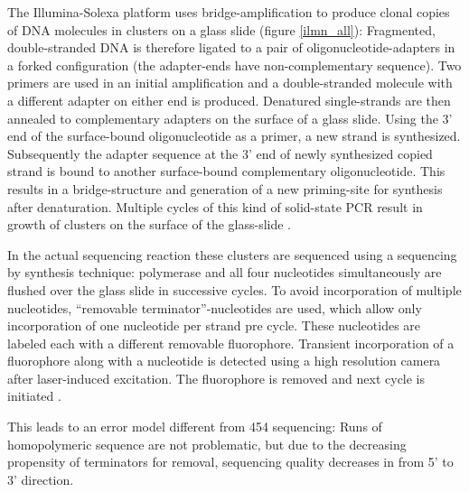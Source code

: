 
The Illumina-Solexa platform uses bridge-amplification to produce
clonal copies of DNA molecules in clusters on a glass slide (figure
\ref{ilmn_all}): Fragmented, double-stranded DNA is therefore ligated to
a pair of oligonucleotide-adapters in a forked configuration (the
adapter-ends have non-complementary sequence). Two primers are used in
an initial amplification and a double-stranded molecule with a
different adapter on either end is produced. Denatured single-strands
are then annealed to complementary adapters on the surface of a glass
slide. Using the 3' end of the surface-bound oligonucleotide as a
primer, a new strand is synthesized. Subsequently the adapter sequence
at the 3' end of newly synthesized copied strand is bound to another
surface-bound complementary oligonucleotide. This results in a
bridge-structure and generation of a new priming-site for synthesis
after denaturation. Multiple cycles of this kind of solid-state PCR
result in growth of clusters on the surface of the glass-slide
\cite{pmid18987734}.

In the actual sequencing reaction these clusters are sequenced using a
sequencing by synthesis technique: polymerase and all four nucleotides
simultaneously are flushed over the glass slide in successive
cycles. To avoid incorporation of multiple nucleotides, ``removable
terminator''-nucleotides are used, which allow only incorporation of
one nucleotide per strand pre cycle. These nucleotides are labeled
each with a different removable fluorophore. Transient incorporation
of a fluorophore along with a nucleotide is detected using a high
resolution camera after laser-induced excitation. The fluorophore is
removed and next cycle is initiated \cite{pmid18987734}.

This leads to an error model different from 454 sequencing: Runs of
homopolymeric sequence are not problematic, but due to the decreasing
propensity of terminators for removal, sequencing quality decreases in
from 5' to 3' direction.

